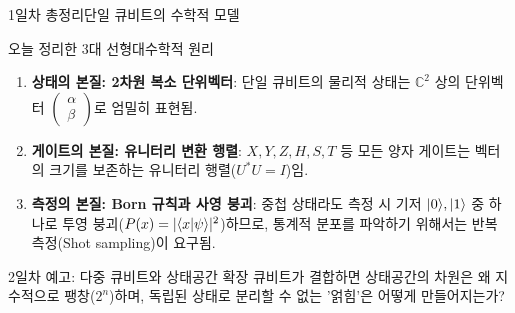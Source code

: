 \documentclass[aspectratio=169, 10pt]{beamer}
\begin{document}
\begin{frame}{1일차 총정리}{단일 큐비트의 수학적 모델}
    \begin{block}{오늘 정리한 3대 선형대수학적 원리}
        \begin{enumerate}
            \item \textbf{상태의 본질: 2차원 복소 단위벡터}:
            단일 큐비트의 물리적 상태는 $\mathbb{C}^2$ 상의 단위벡터 $\begin{pmatrix} \alpha \\ \beta \end{pmatrix}$로 엄밀히 표현됨.
            \item \textbf{게이트의 본질: 유니터리 변환 행렬}:
            $X, Y, Z, H, S, T$ 등 모든 양자 게이트는 벡터의 크기를 보존하는 유니터리 행렬($U^* U = I$)임.
            \item \textbf{측정의 본질: Born 규칙과 사영 붕괴}:
            중첩 상태라도 측정 시 기저 $|0\rangle, |1\rangle$ 중 하나로 투영 붕괴($P(x)=|\langle x|\psi\rangle|^2$)하므로, 통계적 분포를 파악하기 위해서는 반복 측정(Shot sampling)이 요구됨.
        \end{enumerate}
    \end{block}
    \vspace{0.2cm}
    \begin{exampleblock}{2일차 예고: 다중 큐비트와 상태공간 확장}
        큐비트가 결합하면 상태공간의 차원은 왜 지수적으로 팽창($2^n$)하며, 독립된 상태로 분리할 수 없는 '얽힘'은 어떻게 만들어지는가?
    \end{exampleblock}
\end{frame}
\end{document}
